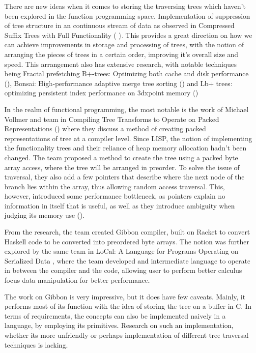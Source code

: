 There are new ideas when it comes to storing the traversing trees which haven't been explored in the function programming space. Implementation of suppression of tree structure in an continuous stream of data as observed in Compressed Suffix Trees with Full Functionality (\textcite{sadakane2007compressed} ). This provides a great direction on how we can achieve improvements in storage and processing of trees, with the notion of arranging the pieces of trees in a certain order, improving it's overall size and speed. This arrangement also has extensive research, with notable techniques being Fractal prefetching B+-trees: Optimizing both cache and disk performance (\textcite{chen2002fractal}), Bonsai: High-performance adaptive merge tree sorting (\textcite{samardzic2020bonsai}) and Lb+ trees: optimizing persistent index performance on 3dxpoint memory (\textcite{liu2020lb+})

In the realm of functional programming, the most notable is the work of Michael Vollmer and team in Compiling Tree Transforms to Operate on Packed
Representations (\textcite{vollmer2017compiling}) where they discuss a method of creating packed representations of tree at a compiler level. Since LISP, the notion of implementing the functionality trees and their reliance of heap memory allocation hadn't been changed. The team proposed a method to create the tree using a packed byte array access, where the tree will be arranged in preorder.  To solve the issue of traversal, they also add a few pointers that describe where the next node of the branch lies within the array, thus allowing random access traversal. This, however, introduced some performance bottleneck, as pointers explain no information in itself that is useful, as well as they introduce ambiguity when judging its memory use (\textcite{bagnara2023c}). 

From the research, the team created Gibbon compiler, built on Racket to convert Haskell code to be converted into preordered byte arrays. The notion was further explored by the same team in LoCal: A Language for Programs Operating on Serialized Data \textcite{vollmer2019local}, where the team developed and intermediate language to operate in between the compiler and the code, allowing user to perform better calculus focus data manipulation for better performance. 

The work on Gibbon is very impressive, but it does have few caveats. Mainly, it performs most of its function with the idea of storing the tree on a buffer in C. In terms of requirements, the concepts can also be implemented naively in a language, by employing its primitives. Research on such an implementation, whether its more unfriendly or perhaps implementation of different tree traversal techniques is lacking. 

